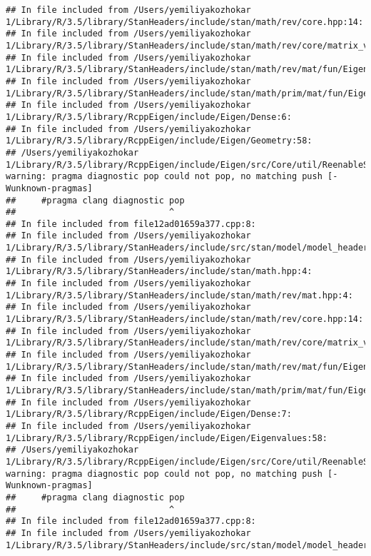 \documentclass[]{article}
\begin{document}
\begin{verbatim}
## In file included from /Users/yemiliyakozhokar 1/Library/R/3.5/library/StanHeaders/include/stan/math/rev/core.hpp:14:
## In file included from /Users/yemiliyakozhokar 1/Library/R/3.5/library/StanHeaders/include/stan/math/rev/core/matrix_vari.hpp:4:
## In file included from /Users/yemiliyakozhokar 1/Library/R/3.5/library/StanHeaders/include/stan/math/rev/mat/fun/Eigen_NumTraits.hpp:4:
## In file included from /Users/yemiliyakozhokar 1/Library/R/3.5/library/StanHeaders/include/stan/math/prim/mat/fun/Eigen.hpp:4:
## In file included from /Users/yemiliyakozhokar 1/Library/R/3.5/library/RcppEigen/include/Eigen/Dense:6:
## In file included from /Users/yemiliyakozhokar 1/Library/R/3.5/library/RcppEigen/include/Eigen/Geometry:58:
## /Users/yemiliyakozhokar 1/Library/R/3.5/library/RcppEigen/include/Eigen/src/Core/util/ReenableStupidWarnings.h:10:30: warning: pragma diagnostic pop could not pop, no matching push [-Wunknown-pragmas]
##     #pragma clang diagnostic pop
##                              ^
## In file included from file12ad01659a377.cpp:8:
## In file included from /Users/yemiliyakozhokar 1/Library/R/3.5/library/StanHeaders/include/src/stan/model/model_header.hpp:4:
## In file included from /Users/yemiliyakozhokar 1/Library/R/3.5/library/StanHeaders/include/stan/math.hpp:4:
## In file included from /Users/yemiliyakozhokar 1/Library/R/3.5/library/StanHeaders/include/stan/math/rev/mat.hpp:4:
## In file included from /Users/yemiliyakozhokar 1/Library/R/3.5/library/StanHeaders/include/stan/math/rev/core.hpp:14:
## In file included from /Users/yemiliyakozhokar 1/Library/R/3.5/library/StanHeaders/include/stan/math/rev/core/matrix_vari.hpp:4:
## In file included from /Users/yemiliyakozhokar 1/Library/R/3.5/library/StanHeaders/include/stan/math/rev/mat/fun/Eigen_NumTraits.hpp:4:
## In file included from /Users/yemiliyakozhokar 1/Library/R/3.5/library/StanHeaders/include/stan/math/prim/mat/fun/Eigen.hpp:4:
## In file included from /Users/yemiliyakozhokar 1/Library/R/3.5/library/RcppEigen/include/Eigen/Dense:7:
## In file included from /Users/yemiliyakozhokar 1/Library/R/3.5/library/RcppEigen/include/Eigen/Eigenvalues:58:
## /Users/yemiliyakozhokar 1/Library/R/3.5/library/RcppEigen/include/Eigen/src/Core/util/ReenableStupidWarnings.h:10:30: warning: pragma diagnostic pop could not pop, no matching push [-Wunknown-pragmas]
##     #pragma clang diagnostic pop
##                              ^
## In file included from file12ad01659a377.cpp:8:
## In file included from /Users/yemiliyakozhokar 1/Library/R/3.5/library/StanHeaders/include/src/stan/model/model_header.hpp:4:

\end{verbatim}
\end{document}
